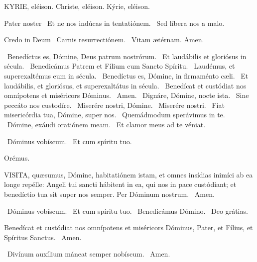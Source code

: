 
KYRIE, eléison. Christe, eléison. Kýrie, eléison.

Pater noster  \V\ Et ne nos indúcas in tentatiónem. \R\ Sed líbera nos a malo.

Credo in Deum  \V\ Carnis resurrectiónem. \R\ Vitam ætérnam. Amen.

\V\ Benedíctus es, Dómine, Deus patrum nostrórum. \R\ Et laudábilis et gloriósus in sécula. \V\ Benedicámus Patrem et Fílium cum Sancto Spíritu. \R\ Laudémus, et superexaltémus eum in sécula. \V\ Benedíctus es, Dómine, in firmaménto cæli. \R\ Et laudábilis, et gloriósus, et superexaltátus in sécula. \V\ Benedícat et custódiat nos omnípotens et miséricors Dóminus. \R\ Amen. \V\ Dignáre, Dómine, nocte ista. \R\ Sine peccáto nos custodíre. \V\ Miserére nostri, Dómine. \R\ Miserére nostri. \V\ Fiat misericórdia tua, Dómine, super nos. \R\ Quemádmodum sperávimus in te. \V\ Dómine, exáudi oratiónem meam. \R\ Et clamor meus ad te véniat.


\V\ Dóminus vobíscum. \R\ Et cum spíritu tuo.

Orémus. 

\lettrine[lines=2]{V}{ISITA}, quæsumus, Dómine, habitatiónem istam, et omnes insídias inimíci ab ea longe repélle: Angeli tui sancti hábitent in ea, qui nos in pace custódiant; et benedíctio tua sit super nos semper. Per Dóminum nostrum. \R\ Amen.


\V\ Dóminus vobíscum. \R\ Et cum spíritu tuo. \V\ Benedicámus Dómino. \R\ Deo grátias.

 Benedícat et custódiat nos omnípotens et miséricors Dóminus, Pater, et Fílius, et Spíritus Sanctus. \R\ Amen.



\V\ Divínum auxílium máneat semper nobíscum. \R\ Amen.


